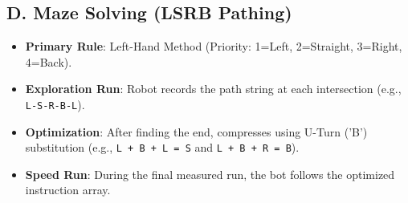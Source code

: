 \documentclass[12pt,a4paper]{article}
\begin{document}
\subsection*{D. Maze Solving (LSRB Pathing)}
\begin{itemize}
    \item \textbf{Primary Rule}: Left-Hand Method (Priority: 1=Left, 2=Straight, 3=Right, 4=Back).
    \item \textbf{Exploration Run}: Robot records the path string at each intersection (e.g., \lstinline|L-S-R-B-L|).
    \item \textbf{Optimization}: After finding the end, compresses using U-Turn ('B') substitution (e.g., \lstinline|L + B + L = S| and \lstinline|L + B + R = B|).
    \item \textbf{Speed Run}: During the final measured run, the bot follows the optimized instruction array.
\end{itemize}
\end{document}
